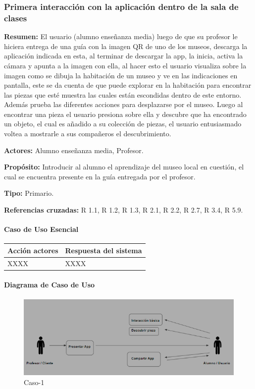 \subsubsection{Primera interacción con la aplicación dentro de la sala de clases}

{\textbf {Resumen:}}
El usuario (alumno enseñanza media) luego de que su profesor le hiciera entrega de una guía con la imagen QR de uno de los museos, descarga la aplicación indicada en esta, al terminar de descargar la app, la inicia, activa la cámara y apunta a la imagen con ella, al hacer esto el usuario visualiza sobre la imagen como se dibuja la habitación de un museo y ve en las indicaciones en pantalla, este se da cuenta de que puede explorar en la habitación para encontrar las piezas que esté muestra las cuales están escondidas dentro de este entorno. Además prueba las diferentes acciones para desplazarse por el museo. Luego al encontrar una pieza el usuario presiona sobre ella y descubre que ha encontrado un objeto, el cual es añadido a su colección de piezas, el usuario entusiasmado voltea a mostrarle a sus compañeros el descubrimiento.

{\textbf {Actores:}}
Alumno enseñanza media, Profesor.

{\textbf {Propósito:}}
Introducir al alumno el aprendizaje del museo local en cuestión, el cual se encuentra presente en la guía entregada por el profesor.

{\textbf {Tipo:}}
Primario.

{\textbf {Referencias cruzadas:}}
R 1.1, R 1.2, R 1.3, R 2.1, R 2.2, R 2.7, R 3.4, R 5.9.

\paragraph{Caso de Uso Esencial}

\begin{longtable}{|p{5cm}|p{8cm}|}
\hline 
Acción actores & Respuesta del sistema \\ 
\hline 
XXXX & XXXX \\ 
\hline 
\end{longtable}

\paragraph{Diagrama de Caso de Uso}

\begin{figure}[H]
\centerline{\includegraphics[width=15cm]{imgs/CasoUso_1.PNG}}
\caption{Caso-1}
\label{fig}
\end{figure}

